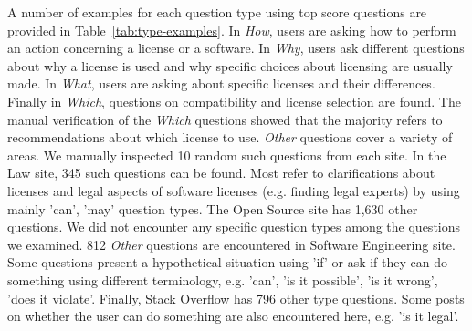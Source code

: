 \documentclass{elsarticle}
\begin{document}
A number of examples for each question type using top score questions are provided in Table~\ref{tab:type-examples}. In \emph{How}, users are asking how to perform an action concerning a license or a software. In \emph{Why}, users ask different questions about why a license is used and why specific choices about licensing are usually made. In \emph{What}, users are asking about specific licenses and their differences. Finally in \emph{Which}, questions on compatibility and license selection are found. The manual verification of the \emph{Which} questions showed that the majority refers to recommendations about which license to use. \emph{Other} questions cover a variety of areas. We manually inspected 10 random such questions from each site. In the Law site, 345 such questions can be found. Most refer to clarifications about licenses and legal aspects of software licenses (e.g. finding legal experts) by using mainly 'can', 'may' question types. The Open Source site has 1,630 other questions. We did not encounter any specific question types among the questions we examined. 812 \emph{Other} questions are encountered in Software Engineering site. Some questions present a hypothetical situation using 'if' or ask if they can do something using different terminology, e.g. 'can', 'is it possible', 'is it wrong', 'does it violate'. Finally, Stack Overflow has 796 other type questions. Some posts on whether the user can do something are also encountered here, e.g. 'is it legal'.
\end{document}
